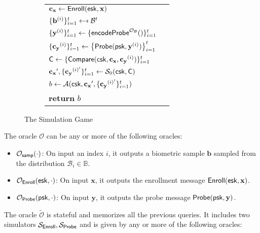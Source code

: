 \begin{figure}[h]
\begin{center}
\begin{subfigure}[t]{0.49\textwidth}
\begin{tabular}{l c}
			$\mathbf{c_x} \gets {\sf Enroll}({\sf esk}, \mathbf{x})$ \\

			$\{ \mathbf{b}^{(i)} \}_{i=1}^t \getsdollar \mathcal{B}^t$ \\ 

			$\{\mathbf{y}^{(i)}\}_{i=1}^t \gets \{{\sf encodeProbe}^{\mathcal{O}_{\mathcal{B}}}()\}_{i=1}^t $ \\
			
			$\{ \mathbf{c_y}^{(i)} \}_{i=1}^t \gets \left\{ {\sf Probe}( {\sf psk}, \mathbf{y}^{(i)} ) \right \}_{i=1}^t$ \\

			${\sf C} \gets \{ {\sf Compare}({\sf csk}, \mathbf{c_x}, \mathbf{c_y}^{(i)}) \}_{i=1}^t$ \\

			$\mathbf{c_x}', \{\mathbf{c_y}^{(i)'}\}_{i=1}^t \gets \mathcal{S}_0( {\sf csk}, {\sf C} )$ \\

			$b \gets \mathcal{A} ({\sf csk}, \mathbf{c_x}', \{ \mathbf{c_y}^{(i)'} \}_{i=1}^t )$ \\

			\textbf{return} $b$
			
		\end{tabular}
		\end{subfigure}
	\end{center}
	\caption{The Simulation Game}
	\label{fig:sim_game}
\end{figure}

The oracle $\mathcal{O}$ can be any or more of the following oracles:

\begin{itemize}

	\item $\mathcal{O}_{\sf samp}(\cdot)$: On input an index $i$, it outputs a biometric sample $\mathbf{b}$ sampled from the distribution $\mathcal{B}_i \in \mathbb{B}$.

	\item $\mathcal{O}_{\sf Enroll}({\sf esk}, \cdot)$: On input $\mathbf{x}$, it outputs the enrollment message ${\sf Enroll}({\sf esk}, \mathbf{x})$.

	\item $\mathcal{O}_{\sf Probe}({\sf psk}, \cdot)$: On input $\mathbf{y}$, it outputs the probe message ${\sf Probe}({\sf psk}, \mathbf{y})$.

\end{itemize}

The oracle $\tilde{\mathcal{O}}$ is stateful and memorizes all the previous queries. It includes two simulators $\mathcal{S}_{\sf Enroll}, \mathcal{S}_{\sf Probe}$ and is given by any or more of the following oracles:

